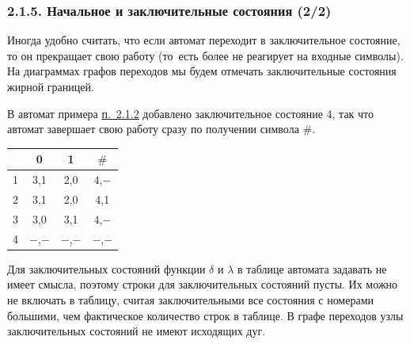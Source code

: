 \documentclass[mathserif,12pt,aspectratio=169]{beamer}
\def\DMref#1#2{{\color{blue}\underline{\hyperlink{#2}{#1}}}}
\begin{document}
\begin{frame}
\frametitle{2.1.5. Начальное и заключительные состояния (2/2)}
Иногда удобно
считать, что если автомат переходит в заключительное состояние, то
он прекращает свою работу (то~есть более не реагирует на входные
символы).
На
диаграммах графов переходов мы будем отмечать заключительные
состояния жирной границей.
\begin{example}
В автомат примера \DMref{п.~2.1.2}{2.1.2.} добавлено заключительное состояние
4, так что автомат завершает свою работу сразу по получении
символа $\#$.
\begin{center}
\begin{tabular}{c|c|c|c}
       & 0 & 1 & $\#$ \\
  \hline
  1 & 3,1 & 2,0 & $4$,$-$ \\
  2 & 3,1 & 2,0 & 4,1 \\
  3 & 3,0 & 3,1 & $4$,$-$ \\
  4 & $-$,$-$ & $-$,$-$ & $-$,$-$ \\
  \end{tabular}
\end{center}
\end{example}

\begin{remark}
Для заключительных состояний функции $\delta$ и $\lambda$ в
таблице автомата задавать не имеет смысла, поэтому строки для
заключительных состояний пусты. Их можно не включать в таблицу,
считая заключительными все состояния с номерами большими, чем
фактическое количество строк в таблице.
В графе переходов узлы
заключительных состояний не имеют исходящих дуг.
\end{remark}

\end{frame}
\end{document}
